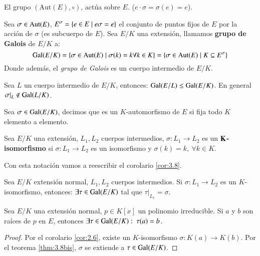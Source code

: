 El grupo $(\mathrm{Aut}(E), \circ)$, actúa sobre $E$. ($e \cdot \sigma = \sigma(e) = e$).

\begin{dfn}
Sea $\sigma \in \mathrm{Aut}(E)$, $E^\sigma = \left\{e \in E \mid e \sigma = e\right\}$ el conjunto de puntos fijos de $E$ por la acción de $\sigma$ (es subcuerpo de $E$). Sea $E/K$ una extensión, llamamos \textbf{grupo de Galois} de $E/K$ a:
$$
    \mathrm{Gal}(E/K) = \left\{\sigma \in \mathrm{Aut}(E) \mid \sigma(k) = k \forall k \in K\right\} = \left\{\sigma \in \mathrm{Aut}(E) \mid K \subseteq E^\sigma\right\}
$$
Donde además, el \textit{grupo de Galois} es un cuerpo intermedio de $E/K$.
\end{dfn}

\begin{pro} %
Sea $L$ un cuerpo intermedio de $E/K$, entonces: $\mathrm{Gal}(E/L) \leq \mathrm{Gal}(E/K)$. En general $\left.\sigma\right|_L \notin \mathrm{Gal}(L/K)$.
\end{pro}

\begin{obs}[Notación]
    Sea $\sigma \in \mathrm{Gal}(E/K)$, decimos que es un $K$-automorfismo de $E$ si fija todo $K$ elemento a elemento.
\end{obs}

\begin{dfn}[$K$-isomorfismo]
    Sea $E/K$ una extensión, $L_1, L_2$ cuerpos intermedios, $\sigma: L_1 \to L_2$ es un $\mathbf{K}$\textbf{-isomorfismo} si $\sigma: L_1 \to L_2$ es un isomorfismo y $\sigma(k) = k,\ \forall k \in K$.
\end{dfn}

Con esta notación vamos a reescribir el corolario \ref{cor:3.8}.
\begin{thm}\label{thm:3.8bis}
    Sea $E/K$ extensión normal, $L_1, L_2$ cuerpos intermedios. Si $\sigma: L_1 \to L_2$ es un $K$-isomorfismo, entonces: $\exists \tau \in \mathrm{Gal}(E/K)$ tal que $\left. \tau \right|_{L_1} = \sigma$.
\end{thm}

\begin{cor} \label{cor:3.10}
    Sea $E/K$ una extensión normal, $p \in K[x]$ un polinomio irreducible. Si $a$ y $b$ son raíces de $p$ en $E$, entonces $\exists \tau \in \mathrm{Gal}(E/K):\ \tau(a) = b$.
\end{cor}
\begin{proof}
    Por el corolario \ref{cor:2.6}, existe un $K$-isomorfismo $\sigma: K(a) \to K(b)$. Por el teorema \ref{thm:3.8bis}, $\sigma$ se extiende a $\tau \in \mathrm{Gal}(E/K)$.
\end{proof}

